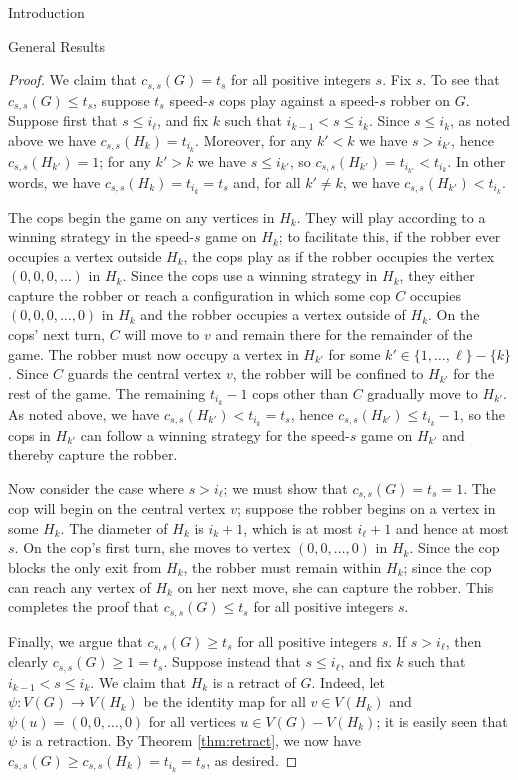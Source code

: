 \documentclass[12pt]{amsart}
\theoremstyle{definition}
\newcommand{\speeds}{c_{s,s}}
\begin{document}
\begin{section}{Introduction}
\begin{section}{General Results}
\begin{proof}
    We claim that $\speeds(G)=t_s$ for all positive integers $s$. Fix $s$.  To see that $\speeds(G) \le t_s$, suppose $t_s$ speed-$s$ cops play against a speed-$s$ robber on $G$.  Suppose first that $s \le i_{\ell}$, and fix $k$ such that $i_{k-1} < s \le i_{k}$.  Since $s \le i_{k}$, as noted above we have $\speeds(H_k) = t_{i_k}$.  Moreover, for any $k'< k$ we have $s > i_{k'}$, hence $\speeds(H_{k'}) = 1$; for any $k' > k$ we have $s \le i_{k'}$, so $\speeds(H_{k'}) = t_{i_{k'}} < t_{i_{k}}$. In other words, we have $\speeds(H_k) = t_{i_k} = t_s$ and, for all $k' \not = k$, we have $\speeds(H_{k'}) < t_{i_{k}}$.    
    
    The cops begin the game on any vertices in $H_k$.  They will play according to a winning strategy in the speed-$s$ game on $H_k$; to facilitate this, if the robber ever occupies a vertex outside $H_k$, the cops play as if the robber occupies the vertex $(0,0,0,\dots)$ in $H_k$.  Since the cops use a winning strategy in $H_k$, they either capture the robber or reach a configuration in which some cop $C$ occupies $(0,0,0,\dots,0)$ in $H_k$ and the robber occupies a vertex outside of $H_k$.  On the cops' next turn, $C$ will move to $v$ and remain there for the remainder of the game.  The robber must now occupy a vertex in $H_{k'}$ for some $k'\in\{1,\dots,\ell\}-\{k\}$.  Since $C$ guards the central vertex $v$, the robber will be confined to $H_{k'}$ for the rest of the game.  The remaining $t_{i_k}-1$ cops other than $C$ gradually move to $H_{k'}$.  As noted above, we have $\speeds(H_{k'}) < t_{i_k} = t_s$, hence $\speeds(H_{k'}) \le t_{i_k}-1$, so the cops in $H_{k'}$ can follow a winning strategy for the speed-$s$ game on $H_{k'}$ and thereby capture the robber.

    Now consider the case where $s > i_{\ell}$; we must show that $\speeds(G) = t_s = 1$.  The cop will begin on the central vertex $v$; suppose the robber begins on a vertex in some $H_k$.  The diameter of $H_k$ is $i_{k}+1$, which is at most $i_{\ell}+1$ and hence at most $s$.  On the cop's first turn, she moves to vertex $(0, 0, \dots, 0)$ in $H_k$.  Since the cop blocks the only exit from $H_k$, the robber must remain within $H_k$; since the cop can reach any vertex of $H_k$ on her next move, she can capture the robber.  This completes the proof that $\speeds(G) \le t_s$ for all positive integers $s$.

    Finally, we argue that $\speeds(G) \ge t_s$ for all positive integers $s$.  If $s > i_{\ell}$, then clearly $\speeds(G) \ge 1 = t_s$.  Suppose instead that $s \le i_{\ell}$, and fix $k$ such that $i_{k-1} < s \le i_{k}$.  We claim that $H_k$ is a retract of $G$.  Indeed, let $\psi:V(G)\to V(H_k)$ be the identity map for all $v\in V(H_k)$ and $\psi(u)=(0,0,\dots,0)$ for all vertices $u\in V(G)-V(H_k)$; it is easily seen that $\psi$ is a retraction.  By Theorem \ref{thm:retract}, we now have $\speeds(G)\ge\speeds(H_k)=t_{i_k} = t_s$, as desired.
\end{proof}
\end{section}



\end{section}
\end{document}
